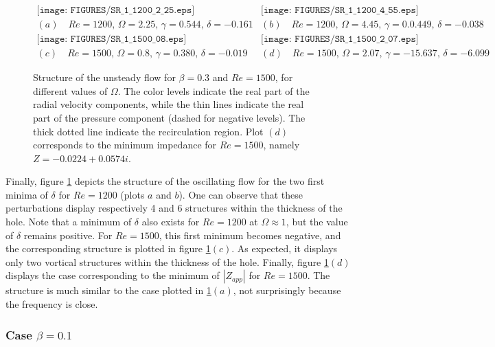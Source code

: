 \documentclass{jfm}
\begin{document}
\begin{figure}
$$
\begin{array}{cc}
\texttt{[image: FIGURES/SR\_1\_1200\_2\_25.eps]} &
\texttt{[image: FIGURES/SR\_1\_1200\_4\_55.eps]} \\
(a) \quad Re = 1200, \, \Omega = 2.25, \, \gamma = 0.544,\, \delta =-0.161 & 
(b) \quad Re = 1200, \, \Omega = 4.45,  \, \gamma = 0.0.449,\, \delta =-0.038 \\
\texttt{[image: FIGURES/SR\_1\_1500\_08.eps]} &
\texttt{[image: FIGURES/SR\_1\_1500\_2\_07.eps]} \\
(c) \quad Re = 1500, \, \Omega = 0.8,  \, \gamma = 0.380,\, \delta =-0.019 & 
(d) \quad Re = 1500, \, \Omega = 2.07,  \, \gamma = -15.637,\, \delta =-6.099
\end{array}
$$
\caption{ Structure of the unsteady flow for $\beta = 0.3$ and $Re = 1500$, for different values of $\Omega$.
The color levels indicate the real part of the radial velocity components, while the thin lines indicate the real part of the pressure component (dashed for negative levels). The thick dotted line indicate the recirculation region. 
Plot $(d)$ corresponds to the minimum impedance for $Re=1500$, namely $Z = -0.0224+0.0574i$.
}
\label{fig:Struct1}
\end{figure}


Finally, figure \ref{fig:Struct1} depicts the structure of the oscillating flow for the two first minima of $\delta$ for $Re = 1200$ (plots $a$ and $b$). One can observe that these perturbations display respectively 4 and 6 structures within the thickness of the hole. Note that a minimum of $\delta$ also exists for $Re =1200$ at $\Omega \approx 1$, but the value of $\delta$ remains positive. For $Re= 1500$, this first minimum becomes negative, and the
corresponding structure is plotted in figure \ref{fig:Struct1}$(c)$. As expected, it displays only two vortical structures within the thickness of the hole. Finally, figure \ref{fig:Struct1}$(d)$ displays the case corresponding to the minimum of $|Z_{app}|$ for $Re = 1500$. 
The structure is much similar to the case plotted in \ref{fig:Struct1}$(a)$, not surprisingly because the frequency is close.






\subsubsection{Case $\beta = 0.1$}


\end{document}
